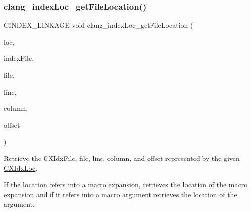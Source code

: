 \subsubsection{\texorpdfstring{clang\+\_\+index\+Loc\+\_\+get\+File\+Location()}{clang\_indexLoc\_getFileLocation()}}
{\footnotesize\ttfamily C\+I\+N\+D\+E\+X\+\_\+\+L\+I\+N\+K\+A\+GE void clang\+\_\+index\+Loc\+\_\+get\+File\+Location (\begin{DoxyParamCaption}\item[{\hyperlink{structCXIdxLoc}{C\+X\+Idx\+Loc}}]{loc,  }\item[{\hyperlink{group__CINDEX__HIGH_ga6fd9c59c0b0a0a21622e5bcfc08156cc}{C\+X\+Idx\+Client\+File} $\ast$}]{index\+File,  }\item[{\hyperlink{group__CINDEX__FILES_gacfcea9c1239c916597e2e5b3e109215a}{C\+X\+File} $\ast$}]{file,  }\item[{unsigned $\ast$}]{line,  }\item[{unsigned $\ast$}]{column,  }\item[{unsigned $\ast$}]{offset }\end{DoxyParamCaption})}



Retrieve the C\+X\+Idx\+File, file, line, column, and offset represented by the given \hyperlink{structCXIdxLoc}{C\+X\+Idx\+Loc}. 

If the location refers into a macro expansion, retrieves the location of the macro expansion and if it refers into a macro argument retrieves the location of the argument. \mbox{\label{group__CINDEX__HIGH_gaa5c2ad8979779c401b91110d444e2be6}} 
